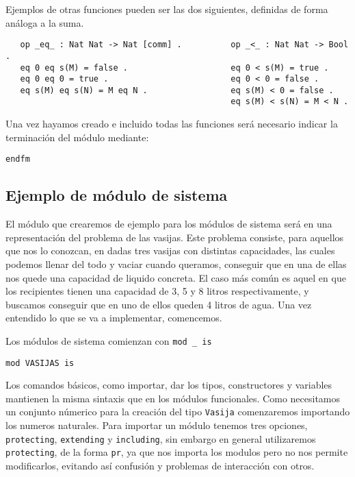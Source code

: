 Ejemplos de otras funciones pueden ser las dos siguientes, definidas de forma análoga a la suma.\par

{\codesize
\begin{verbatim}
   op _eq_ : Nat Nat -> Nat [comm] .          op _<_ : Nat Nat -> Bool .
   eq 0 eq s(M) = false .                     eq 0 < s(M) = true .
   eq 0 eq 0 = true .                         eq 0 < 0 = false .
   eq s(M) eq s(N) = M eq N .                 eq s(M) < 0 = false .
                                              eq s(M) < s(N) = M < N .	

\end{verbatim}
}

Una vez hayamos creado e incluido todas las funciones será necesario indicar la terminación del módulo mediante: \par

{\codesize
\begin{verbatim}
endfm
\end{verbatim}
}

\subsection{Ejemplo de módulo de sistema}

El módulo que crearemos de ejemplo para los módulos de sistema será en una representación del problema de las vasijas. Este problema consiste, para aquellos que nos lo conozcan, en dadas tres vasijas con distintas capacidades, las cuales podemos llenar del todo y vaciar cuando queramos, conseguir que en una de ellas nos quede una capacidad de liquido concreta. El caso más común es aquel en que los recipientes tienen una capacidad de 3, 5 y 8 litros respectivamente, y buscamos conseguir que en uno de ellos queden 4 litros de agua. Una vez entendido lo que se va a implementar, comencemos. \par

Los módulos de sistema comienzan con \verb"mod _ is"

{\codesize
\begin{verbatim}
mod VASIJAS is
\end{verbatim}
}

Los comandos básicos, como importar, dar los tipos, constructores y variables mantienen la misma sintaxis que en los módulos funcionales. Como necesitamos un conjunto númerico para la creación del tipo \texttt{Vasija} comenzaremos importando los numeros naturales. Para importar un módulo tenemos tres opciones, \texttt{protecting}, \texttt{extending} y \texttt{including}, sin embargo en general utilizaremos \texttt{protecting}, de la forma \texttt{pr}, ya que nos importa los modulos pero no nos permite modificarlos, evitando así confusión y problemas de interacción con otros. \par

